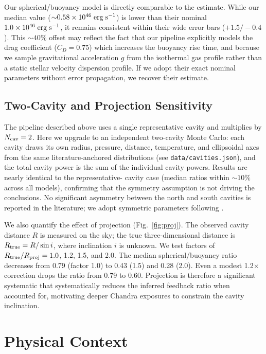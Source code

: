 \documentclass[twocolumn]{aastex63}
\newcommand{\codeloc}[1]{\texttt{#1}}
\newcommand{\erg}{\rm erg}
\newcommand{\s}{\rm s}
\begin{document}
Our spherical/buoyancy model is directly comparable to the \citet{McDonald2015}
estimate. While our median value (${\sim}0.58 \times 10^{46}\;\erg\;\s^{-1}$) is
lower than their nominal $1.0 \times 10^{46}\;\erg\;\s^{-1}$, it remains
consistent within their wide error bars ($+1.5/-0.4$). This ${\sim}40\%$ offset
may reflect the fact that our pipeline explicitly models the drag coefficient
($C_D = 0.75$) which increases the buoyancy rise time, and because we sample
gravitational acceleration $g$ from the isothermal gas profile rather than a
static stellar velocity dispersion profile. If we adopt their exact nominal
parameters without error propagation, we recover their estimate.

\subsection{Two-Cavity and Projection Sensitivity}
\label{sec:twocavity}

The pipeline described above uses a single representative cavity and multiplies
by $N_{\rm cav} = 2$. Here we upgrade to an independent two-cavity Monte Carlo:
each cavity draws its own radius, pressure, distance, temperature, and
ellipsoidal axes from the same literature-anchored distributions (see
\codeloc{data/cavities.json}), and the total cavity power is the sum of the
individual cavity powers. Results are nearly identical to the representative-
cavity case (median ratios within ${\sim}10\%$ across all models), confirming
that the symmetry assumption is not driving the conclusions.
No significant asymmetry between the north and south cavities is reported
in the literature; we adopt symmetric parameters following
\citet{McDonald2015}.

We also quantify the effect of projection (Fig.~\ref{fig:proj}). The observed
cavity distance $R$ is measured on the sky; the true three-dimensional distance
is $R_{\rm true} = R / \sin i$, where inclination $i$ is unknown. We test
factors of $R_{\rm true}/R_{\rm proj} = 1.0$, 1.2, 1.5, and 2.0. The median
spherical/buoyancy ratio decreases from 0.79 (factor 1.0) to 0.43 (1.5) and
0.28 (2.0). Even a modest 1.2$\times$ correction drops the ratio from 0.79 to
0.60. Projection is therefore a significant systematic that systematically
reduces the inferred feedback ratio when accounted for, motivating deeper
Chandra exposures to constrain the cavity inclination.

\section{Physical Context}
\label{sec:context}
\end{document}
